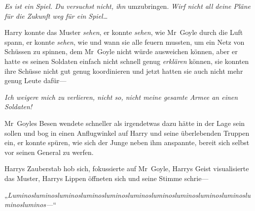 \emph{Es ist ein Spiel. Du versuchst nicht, ihn} umzubringen. \emph{Wirf nicht all deine Pläne für die Zukunft weg für ein Spiel…}

Harry konnte das Muster \emph{sehen}, er konnte \emph{sehen}, wie Mr~Goyle durch die Luft spann, er konnte \emph{sehen}, wie und wann sie alle feuern mussten, um ein Netz von Schüssen zu spinnen, dem Mr~Goyle nicht würde ausweichen können, aber er hatte es seinen Soldaten einfach nicht schnell genug \emph{erklären} können, sie konnten ihre Schüsse nicht gut genug koordinieren und jetzt hatten sie auch nicht mehr genug Leute dafür—

\emph{Ich weigere mich zu verlieren, nicht so, nicht meine gesamte Armee an einen Soldaten!}

Mr~Goyles Besen wendete schneller als irgendetwas dazu hätte in der Lage sein sollen und bog in einen Anflugwinkel auf Harry und seine überlebenden Truppen ein, er konnte spüren, wie sich der Junge neben ihm anspannte, bereit sich selbst vor seinen General zu werfen.

\emph{}

Harrys Zauberstab hob sich, fokussierte auf Mr~Goyle, Harrys Geist visualisierte das Muster, Harrys Lippen öffneten sich und seine Stimme schrie—

„\emph{Luminosluminosluminosluminosluminosluminosluminosluminosluminosluminosluminosluminos—}“

